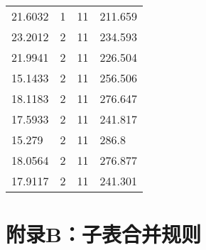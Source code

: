 \documentclass[bwprint]{gmcmthesis}
\begin{document}
\begin{longtable}[c]{llll}
21.6032   & 1           & 11          & 211.659   \\
23.2012   & 2           & 11          & 234.593   \\
21.9941   & 2           & 11          & 226.504   \\
15.1433   & 2           & 11          & 256.506   \\
18.1183   & 2           & 11          & 276.647   \\
17.5933   & 2           & 11          & 241.817   \\
15.279    & 2           & 11          & 286.8     \\
18.0564   & 2           & 11          & 276.877   \\
17.9117   & 2           & 11          & 241.301   \\
\end{longtable}


\newpage
\section{附录B：子表合并规则}
\end{document}
